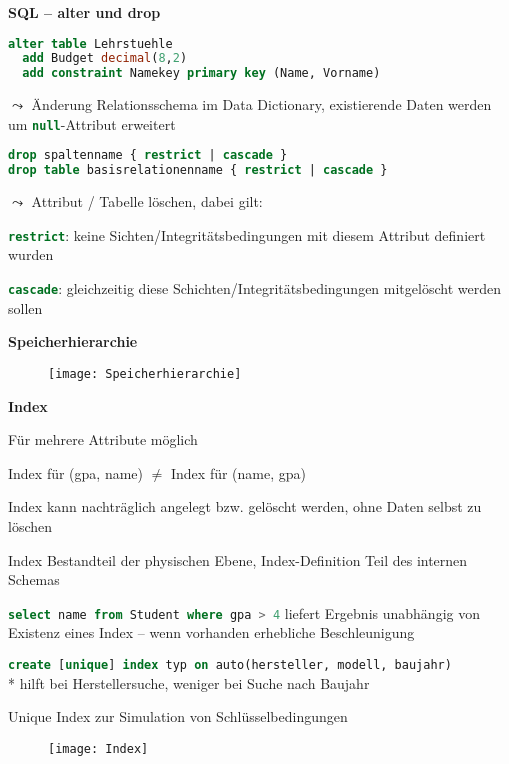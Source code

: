 \textbf{SQL -- alter und drop}
\begin{items}
	\item \begin{lstlisting}[language=sql]
alter table Lehrstuehle
  add Budget decimal(8,2)
  add constraint Namekey primary key (Name, Vorname)
\end{lstlisting}
	\item \( \leadsto \) Änderung Relationsschema im Data Dictionary, existierende Daten werden um \lstinline[language=sql]{null}-Attribut erweitert
	\item \begin{lstlisting}[language=sql]
drop spaltenname { restrict | cascade }
drop table basisrelationenname { restrict | cascade }
\end{lstlisting}
\item \( \leadsto \) Attribut / Tabelle löschen, dabei gilt:
\begin{enumeration}
	\item \lstinline[language=sql]{restrict}: keine Sichten/Integritätsbedingungen mit diesem Attribut definiert wurden
	\item \lstinline[language=sql]{cascade}: gleichzeitig diese Schichten/Integritätsbedingungen mitgelöscht werden sollen
\end{enumeration}
\end{items}

\textbf{Speicherhierarchie}
\begin{figure}[H]\centering\label{Speicherhierarchie}\texttt{[image: Speicherhierarchie]}\end{figure}

\textbf{Index}
\begin{items}
	\item Für mehrere Attribute möglich
	\item Index für (gpa, name) \( \neq \) Index für (name, gpa)
	\item Index kann nachträglich angelegt bzw. gelöscht werden, ohne Daten selbst zu löschen
	\item Index Bestandteil der physischen Ebene, Index-Definition Teil des internen Schemas
	\item \lstinline[language=sql]{select name from Student where gpa > 4} liefert Ergebnis unabhängig von Existenz eines Index -- wenn vorhanden erhebliche Beschleunigung
	\item \lstinline[language=sql]{create [unique] index typ on auto(hersteller, modell, baujahr)} \\* hilft bei Herstellersuche, weniger bei Suche nach Baujahr
	\item Unique Index zur Simulation von Schlüsselbedingungen
\end{items}
\begin{figure}[H]\centering\label{Index}\texttt{[image: Index]}\end{figure}

